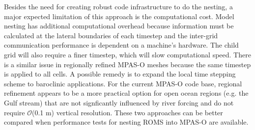 Besides the need for creating robust code infrastructure to do the nesting, a major expected limitation of this approach is the computational cost. Model nesting has additional computational overhead because information must be calculated at the lateral boundaries of each timestep and the inter-grid communication performance is dependent on a machine's hardware. The child grid will also require a finer timestep, which will slow computational speed. There is a similar issue in regionally refined MPAS-O meshes because the same timestep is applied to all cells. A possible remedy is to expand the local time stepping scheme \citep{lilly2023storm} to baroclinic applications. For the current MPAS-O code base, regional refinement appears to be a more practical option for open ocean regions (e.g. the Gulf stream) that are not signficantly influenced by river forcing and do not require $\mathcal{O}$(0.1 m) vertical resolution. These two approaches can be better compared when performance tests for nesting ROMS into MPAS-O are available. 

